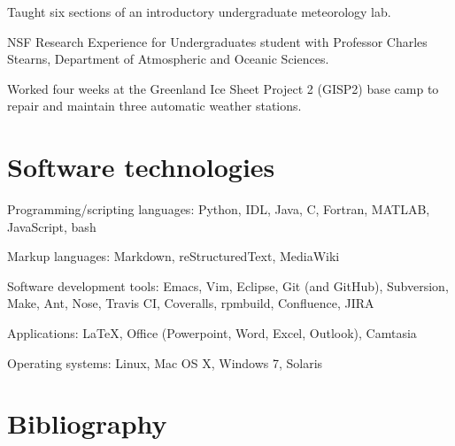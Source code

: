 \documentclass[letterpaper]{resume}
\begin{document}
\begin{compactitem}[\itembullet]
  \item Taught six sections of an introductory undergraduate
    meteorology lab.
\end{compactitem}

\begin{compactitem}[\itembullet]
  \item NSF Research Experience for Undergraduates student with
    Professor Charles Stearns, Department of Atmospheric and Oceanic
    Sciences.
  \item Worked four weeks at the Greenland Ice Sheet Project 2 (GISP2)
    base camp to repair and maintain three automatic weather stations.
\end{compactitem}


\section{Software technologies}

\vspace{1.0em}
\begin{compactitem}[\itembullet]
\item Programming/scripting languages: Python, IDL, Java, C, Fortran,
  MATLAB, JavaScript, bash
\item Markup languages: Markdown, reStructuredText, MediaWiki
\item Software development tools: Emacs, Vim, Eclipse, Git (and GitHub),
  Subversion, Make, Ant, Nose, Travis CI, Coveralls, rpmbuild, Confluence, JIRA
\item Applications: \LaTeX, Office (Powerpoint, Word, Excel, Outlook),
  Camtasia
\item Operating systems: Linux, Mac OS X, Windows 7, Solaris
\end{compactitem}


\section{Bibliography}
\end{document}
